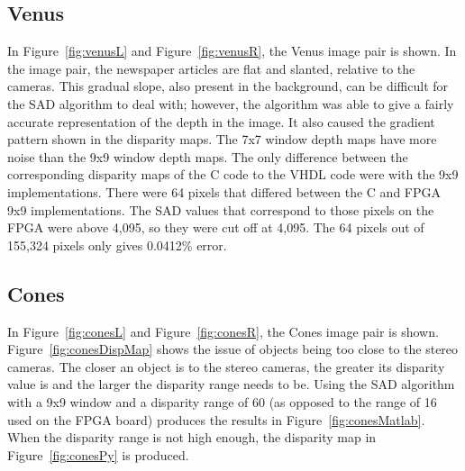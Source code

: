 

\subsection{Venus}
\label{sec:venus}

In Figure~\ref{fig:venusL} and Figure~\ref{fig:venusR}, the Venus image pair is shown. In the image pair, the newspaper articles are flat and slanted, relative to the cameras. This gradual slope, also present in the background, can be difficult for the SAD algorithm to deal with; however, the algorithm was able to give a fairly accurate representation of the depth in the image. It also caused the gradient pattern shown in the disparity maps. The 7x7 window depth maps have more noise than the 9x9 window depth maps. The only difference between the corresponding disparity maps of the C code to the VHDL code were with the 9x9 implementations. There were 64 pixels that differed between the C and FPGA 9x9 implementations. The SAD values that correspond to those pixels on the FPGA were above 4,095, so they were cut off at 4,095. The 64 pixels out of 155,324 pixels only gives 0.0412\% error.


\subsection{Cones}
\label{sec:cones}

In Figure~\ref{fig:conesL} and Figure~\ref{fig:conesR}, the Cones image pair is shown. Figure~\ref{fig:conesDispMap} shows the issue of objects being too close to the stereo cameras. The closer an object is to the stereo cameras, the greater its disparity value is and the larger the disparity range needs to be. Using the SAD algorithm with a 9x9 window and a disparity range of 60 (as opposed to the range of 16 used on the FPGA board) produces the results in Figure~\ref{fig:conesMatlab}. When the disparity range is not high enough, the disparity map in Figure~\ref{fig:conesPy} is produced.



